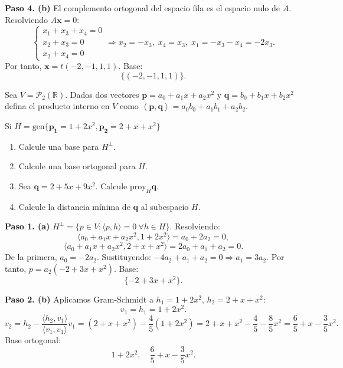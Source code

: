 \begin{prob}
\begin{myproof}
\textbf{Paso 4. (b)} El complemento ortogonal del espacio fila es el espacio nulo de \( A \). Resolviendo \( A\mathbf{x} = 0 \):
\[
\begin{cases}
x_1 + x_3 + x_4 = 0 \\
x_2 + x_3 = 0 \\
x_2 + x_4 = 0
\end{cases}
\Rightarrow x_2 = -x_3,\; x_4 = x_3,\; x_1 = -x_3 - x_4 = -2x_3.
\]
Por tanto, \( \mathbf{x} = t(-2,-1,1,1) \). Base:
\[
\boxed{\{(-2,-1,1,1)\}}.
\]
\end{myproof}
\end{prob}


\begin{prob}
Sea $V=\mathcal{P}_{2}(\mathbb{R})$. Dados dos vectores $\mathbf{p}=a_0+a_1x+a_2x^2$ y  $\mathbf{q}=b_0+b_1x+b_2x^2$  defina el producto interno en $V$ como $\left\langle \mathbf{p},\mathbf{q} \right\rangle=a_0b_0+a_1b_1+a_2b_2$. 

Si $H=\text{gen}\lbrace \mathbf{p_1}=1+2x^2,\mathbf{p_2}=2+x+x^2\rbrace$ 
\begin{enumerate}
\item Calcule una base para $H^{\perp}$.
\item Calcule una base ortogonal para $H$.
\item Sea $\mathbf{q}=2+5x+9x^2$. Calcule $\text{proy}_{H}\mathbf{q}$.
\item Calcule la distancia mínima de $\mathbf{q}$ al subespacio $H$.
\end{enumerate}
\begin{myproof}
\textbf{Paso 1. (a)} \( H^\perp = \{ p \in V : \langle p, h \rangle = 0 \ \forall h \in H \} \).
Resolviendo:
\[
\langle a_0 + a_1x + a_2x^2, 1 + 2x^2 \rangle = a_0 + 2a_2 = 0,
\]
\[
\langle a_0 + a_1x + a_2x^2, 2 + x + x^2 \rangle = 2a_0 + a_1 + a_2 = 0.
\]
De la primera, \( a_0 = -2a_2 \). Sustituyendo: \( -4a_2 + a_1 + a_2 = 0 \Rightarrow a_1 = 3a_2 \).
Por tanto, \( p = a_2(-2 + 3x + x^2) \). Base:
\[
\boxed{\{-2 + 3x + x^2\}}.
\]

\textbf{Paso 2. (b)} Aplicamos Gram-Schmidt a \( h_1 = 1+2x^2 \), \( h_2 = 2+x+x^2 \):
\[
v_1 = h_1 = 1+2x^2.
\]
\[
v_2 = h_2 - \frac{\langle h_2, v_1 \rangle}{\langle v_1, v_1 \rangle} v_1
= (2+x+x^2) - \frac{4}{5}(1+2x^2)
= 2+x+x^2 - \frac{4}{5} - \frac{8}{5}x^2
= \frac{6}{5} + x - \frac{3}{5}x^2.
\]
Base ortogonal:
\[
\boxed{1+2x^2,\quad \frac{6}{5} + x - \frac{3}{5}x^2}.
\]


\end{myproof}
\end{prob}
